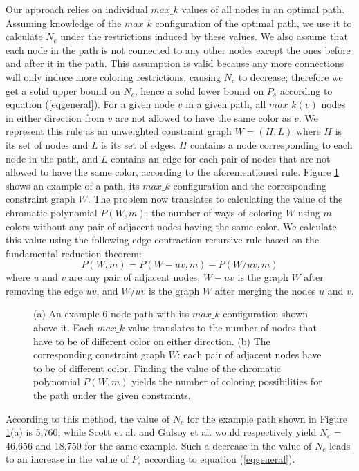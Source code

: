 \documentclass{ws-procs11x85}
\begin{document}
Our approach relies on individual $max\_k$ values of all nodes in an optimal
path. Assuming knowledge of the $max\_k$ configuration of the optimal path, we
use it to calculate $N_c$ under the restrictions induced by these values. We
also assume that each node in the path is not connected to any other nodes
except the ones before and after it in the path. This assumption is valid
because any more connections will only induce more coloring restrictions,
causing $N_c$ to decrease; therefore we get a solid upper bound on $N_c$, hence
a solid lower bound on $P_s$ according to equation (\ref{eqgeneral}). For a given node
$v$ in a given path, all $max\_k(v)$ nodes in either direction from $v$ are not allowed to have the same
color as $v$. We represent this rule as an unweighted constraint graph $W = (H,
L)$ where $H$ is its set of nodes and $L$ is its set of edges. $H$ contains a
node corresponding to each node in the path, and $L$ contains an edge for each
pair of nodes that are not allowed to have the same color, according to the
aforementioned rule. Figure \ref{maxk} shows an example of a path, its $max\_k$
configuration and the corresponding constraint graph $W$. The problem now
translates to calculating the value of the chromatic polynomial $P(W, m)$: the
number of ways of coloring $W$ using $m$ colors without any pair of adjacent
nodes having the same color. We calculate this value using the following
edge-contraction recursive rule based on the fundamental reduction
theorem\cite{dong}:
\begin{equation}
P(W, m) = P(W - uv, m) - P(W / uv, m)
\label{eqchromatic}
\end{equation}
where $u$ and $v$ are any pair of adjacent nodes, $W - uv$ is the graph $W$
after removing the edge $uv$, and $W / uv$ is the graph $W$ after merging the
nodes $u$ and $v$.

\begin{figure}[h]
\centerline{}
\caption{(a) An example 6-node path with its $max\_k$ configuration shown above
it. Each $max\_k$ value translates to the number of nodes that have to be of
different color on either direction. (b) The corresponding constraint graph $W$:
each pair of adjacent nodes have to be of different color. Finding the value of
the chromatic polynomial $P(W, m)$ yields the number of coloring possibilities
for the path under the given constraints.}
\label{maxk}
\end{figure}

According to this method, the value of $N_c$ for the example path shown in
Figure \ref{maxk}(a) is 5,760, while Scott et al.\cite{scott} and G{\"u}lsoy et
al.\cite{gulsoy} would respectively yield $N_c$ = 46,656 and 18,750 for the same
example. Such a decrease in the value of $N_c$ leads to an increase in the value
of $P_s$ according to equation (\ref{eqgeneral}).
\end{document}
